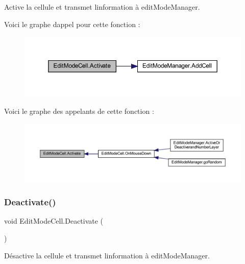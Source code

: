 Active la cellule et transmet l\textquotesingle{}information à edit\+Mode\+Manager. 

Voici le graphe d\textquotesingle{}appel pour cette fonction \+:\nopagebreak
\begin{figure}[H]
\begin{center}
\leavevmode
\includegraphics[width=350pt]{class_edit_mode_cell_ab29acfb84a03e3d04805cb16ba5b4af8_cgraph}
\end{center}
\end{figure}
Voici le graphe des appelants de cette fonction \+:\nopagebreak
\begin{figure}[H]
\begin{center}
\leavevmode
\includegraphics[width=350pt]{class_edit_mode_cell_ab29acfb84a03e3d04805cb16ba5b4af8_icgraph}
\end{center}
\end{figure}
\mbox{\label{class_edit_mode_cell_a972bc99f957f4a37dcd482162e9762c8}} 
\subsubsection{\texorpdfstring{Deactivate()}{Deactivate()}}
{\footnotesize\ttfamily void Edit\+Mode\+Cell.\+Deactivate (\begin{DoxyParamCaption}{ }\end{DoxyParamCaption})\hspace{0.3cm}{\ttfamily [inline]}}



Désactive la cellule et transmet l\textquotesingle{}information à edit\+Mode\+Manager. 

